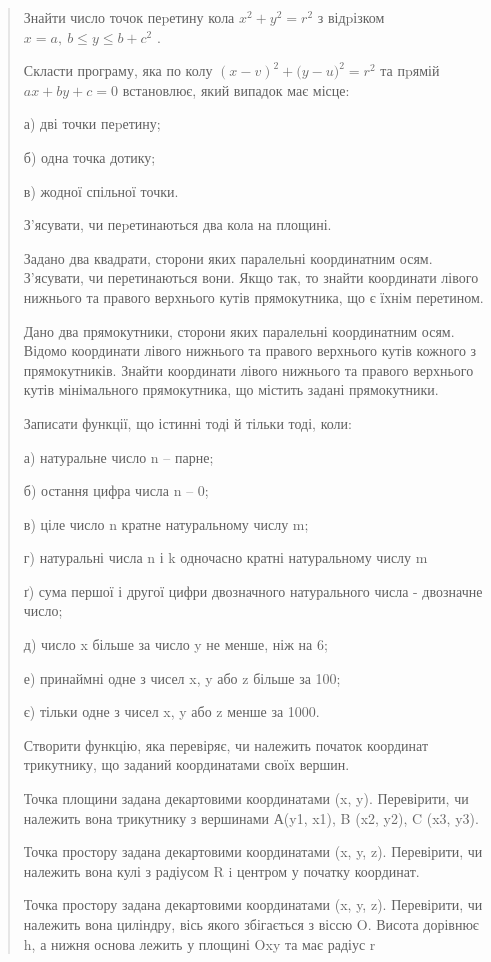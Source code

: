 \documentclass[]{article}
\begin{document}
\begin{quote}
Знайти число точок пеpетину кола \(x^{2} + y^{2} = r^{2}\) з відpізком
\(x = a,\ b \leq y \leq b + c^{2}\) .

Скласти програму, яка по колу \({(x - v)}^{2} + ({y - u)}^{2} = r^{2}\)
та пpямій \(ax + by + c = 0\) встановлює, який випадок має місце:

а) дві точки пеpетину;

б) одна точка дотику;

в) жодної спільної точки.

З'ясувати, чи пеpетинаються два кола на площині.

Задано два квадрати, сторони яких паралельні координатним осям.
З'ясувати, чи перетинаються вони. Якщо так, то знайти координати лівого
нижнього та правого верхнього кутів прямокутника, що є їхнім перетином.

Дано два прямокутники, сторони яких паралельні координатним осям. Відомо
координати лівого нижнього та правого верхнього кутів кожного з
прямокутників. Знайти координати лівого нижнього та правого верхнього
кутів мінімального прямокутника, що містить задані прямокутники.

Записати функції, що істинні тоді й тільки тоді, коли:

а) натуральне число n -- парне;

б) остання цифра числа n -- 0;

в) ціле число n кратне натуральному числу m;

г) натуральні числа n і k одночасно кратні натуральному числу m

ґ) сума першої і другої цифри двозначного натурального числа - двозначне
число;

д) число x більше за число y не менше, ніж на 6;

е) принаймні одне з чисел x, y або z більше за 100;

є) тільки одне з чисел x, y або z менше за 1000.

Створити функцію, яка перевіряє, чи належить початок координат
трикутнику, що заданий координатами своїх вершин.

Точка площини задана декартовими координатами (x, y). Перевірити, чи
належить вона трикутнику з вершинами А(y1, x1), B (x2, y2), C (x3, y3).

Точка простору задана декартовими координатами (x, y, z). Перевірити, чи
належить вона кулі з радіусом R i центром у початку координат.

Точка простору задана декартовими координатами (x, y, z). Перевірити, чи
належить вона циліндру, вісь якого збігається з віссю O. Висота дорівнює
h, а нижня основа лежить у площині Oxy та має радіус r


\end{quote}
\end{document}
